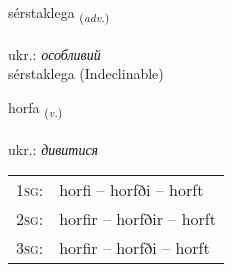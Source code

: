 \documentclass[frontgrid, backgrid]{flacards}\usepackage[]{graphicx}\usepackage[]{xcolor}
\begin{document}

\renewcommand{\flhead}{\vskip5pt \fboxsep=0pt {\small\bfseries\footnotesize Atviksorð | прислівник}}
\renewcommand{\fcfoot}{\vskip5pt \fboxsep=0pt \hspace{2pt}{\small\bfseries\footnotesize 1K}}

\renewcommand{\blhead}{\vskip5pt {\small\bfseries\footnotesize Atviksorð | прислівник }}
\renewcommand{\bcfoot}{\vskip5pt \hspace{2pt}{\small\bfseries\footnotesize 1K}}


{sérstaklega \small{\textsubscript{(\textit{adv.})}} \\[1ex]
 \\
ukr.: \emph{особливий} \\  [2ex]
sérstaklega (Indeclinable)}

\renewcommand{\flhead}{\vskip5pt \fboxsep=0pt {\small\bfseries\footnotesize Sagnorð | дієслово}}
\renewcommand{\fcfoot}{\vskip5pt \fboxsep=0pt \hspace{2pt}{\small\bfseries\footnotesize 1K}}

\renewcommand{\blhead}{\vskip5pt {\small\bfseries\footnotesize Sagnorð | дієслово }}
\renewcommand{\bcfoot}{\vskip5pt \hspace{2pt}{\small\bfseries\footnotesize 1K}}


{horfa \small{\textsubscript{(\textit{v.})}} \\[1ex] %
\textphonetic{[hɔrva]} \\
ukr.: \emph{дивитися} \\  [2ex]
\renewcommand*{\arraystretch}{0.8}
\begin{tabular}{p{1cm}l}
\textsc{1sg}: & horfi -- horfði -- horft \\ 
\textsc{2sg}: & horfir -- horfðir -- horft \\ 
\textsc{3sg}: & horfir -- horfði -- horft \\ 
\end{tabular}
}
\end{document}
